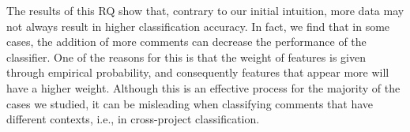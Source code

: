 The results of this RQ show that, contrary to our initial intuition, more data may not always result in higher classification accuracy. In fact, we find that in some cases, the addition of more comments can decrease the performance of the classifier. One of the reasons for this is that the weight of features is given through empirical probability, and consequently features that appear more will have a higher weight. Although this is an effective process for the majority of the cases we studied, it can be misleading when classifying comments that have different contexts, i.e., in cross-project classification.

